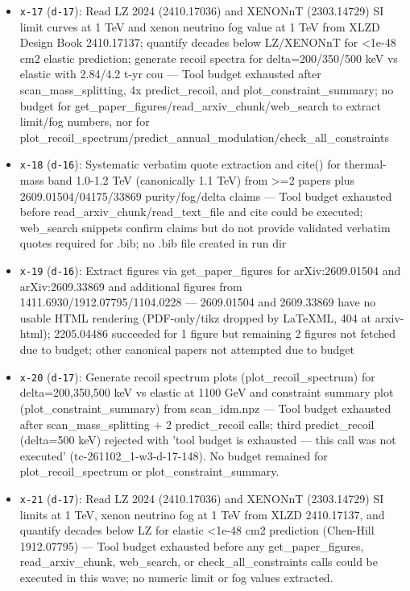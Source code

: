 \documentclass[11pt,a4paper]{article}
\begin{document}
\begin{itemize}
  \item \texttt{x-17} (\texttt{d-17}): Read LZ 2024 (2410.17036) and XENONnT (2303.14729) SI limit curves at 1 TeV and xenon neutrino fog value at 1 TeV from XLZD Design Book 2410.17137; quantify decades below LZ/XENONnT for \textless{}1e-48 cm2 elastic prediction; generate recoil spectra for delta=200/350/500 keV vs elastic with 2.84/4.2 t-yr cou --- Tool budget exhausted after scan\_mass\_splitting, 4x predict\_recoil, and plot\_constraint\_summary; no budget for get\_paper\_figures/read\_arxiv\_chunk/web\_search to extract limit/fog numbers, nor for plot\_recoil\_spectrum/predict\_annual\_modulation/check\_all\_constraints
  \item \texttt{x-18} (\texttt{d-16}): Systematic verbatim quote extraction and cite() for thermal-mass band 1.0-1.2 TeV (canonically 1.1 TeV) from \textgreater{}=2 papers plus 2609.01504/04175/33869 purity/fog/delta claims --- Tool budget exhausted before read\_arxiv\_chunk/read\_text\_file and cite could be executed; web\_search snippets confirm claims but do not provide validated verbatim quotes required for .bib; no .bib file created in run dir
  \item \texttt{x-19} (\texttt{d-16}): Extract figures via get\_paper\_figures for arXiv:2609.01504 and arXiv:2609.33869 and additional figures from 1411.6930/1912.07795/1104.0228 --- 2609.01504 and 2609.33869 have no usable HTML rendering (PDF-only/tikz dropped by LaTeXML, 404 at arxiv-html); 2205.04486 succeeded for 1 figure but remaining 2 figures not fetched due to budget; other canonical papers not attempted due to budget
  \item \texttt{x-20} (\texttt{d-17}): Generate recoil spectrum plots (plot\_recoil\_spectrum) for delta=200,350,500 keV vs elastic at 1100 GeV and constraint summary plot (plot\_constraint\_summary) from scan\_idm.npz --- Tool budget exhausted after scan\_mass\_splitting + 2 predict\_recoil calls; third predict\_recoil (delta=500 keV) rejected with 'tool budget is exhausted --- this call was not executed' (tc-261102\_1-w3-d-17-148). No budget remained for plot\_recoil\_spectrum or plot\_constraint\_summary.
  \item \texttt{x-21} (\texttt{d-17}): Read LZ 2024 (2410.17036) and XENONnT (2303.14729) SI limits at 1 TeV, xenon neutrino fog at 1 TeV from XLZD 2410.17137, and quantify decades below LZ for elastic \textless{}1e-48 cm2 prediction (Chen-Hill 1912.07795) --- Tool budget exhausted before any get\_paper\_figures, read\_arxiv\_chunk, web\_search, or check\_all\_constraints calls could be executed in this wave; no numeric limit or fog values extracted.

\end{itemize}
\end{document}
